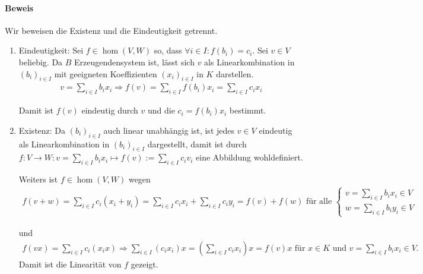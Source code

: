 \paragraph{Beweis}
	Wir beweisen die Existenz und die Eindeutigkeit getrennt. 
	\begin{enumerate}
		\item Eindeutigkeit: Sei $f\in \hom(V,W)$ so, dass $\forall i\in I: f(b_i)=c_i$. Sei $v\in V$ beliebig. Da $ B $ Erzeugendensystem ist, lässt sich $ v $ als Linearkombination in $(b_i)_{i\in I}$ mit geeigneten Koeffizienten $(x_i)_{i\in I}$ in $ K $ darstellen.
			\begin{gather*}
    				v=\sum_{i\in I}b_ix_i \Rightarrow f(v) = \sum_{i\in I} f(b_i)x_i = \sum_{i\in I}c_ix_i
    			\end{gather*}
    
                        Damit ist $ f(v) $ eindeutig durch $ v $ und die $c_i = f(b_i)x_i$ bestimmt.
    
    		\item Existenz: Da $(b_i)_{i\in I}$ auch linear unabhängig ist, ist jedes $v\in V$ eindeutig als Linearkombination in $(b_i)_{i\in I}$ dargestellt, damit ist durch $f:V\to W: v=\sum_{i\in I}b_ix_i \mapsto f(v):=\sum_{i\in I}c_iv_i$ eine Abbildung wohldefiniert.
    
                        Weiters ist $f\in\hom(V,W)$ wegen
                        \begin{gather*}
                                f(v+w) =\sum_{i\in I}c_i(x_i+y_i)=\sum_{i\in I}c_ix_i+ \sum_{i\in I}c_iy_i =  f(v) + f(w) \text{ für alle }\left\{
                                        \begin{array}{l}
                                                v=\sum_{i\in I}b_ix_i \in V\\
                                                w=\sum_{i\in I}b_iy_i \in V
                                        \end{array}
                                \right.
                        \end{gather*}
    
                        und
                        \begin{gather*}
                            f(vx) =\sum_{i\in I}c_i(x_ix)\Rightarrow\sum_{i\in I}(c_ix_i)x = (\sum_{i\in I}c_ix_i)x= f(v)x \text{ für }  x\in K\text{ und }v= \sum_{i\in I}b_ix_i \in V.
                        \end{gather*}
                        Damit ist die Linearität von $ f $ gezeigt.
        \end{enumerate}
    
